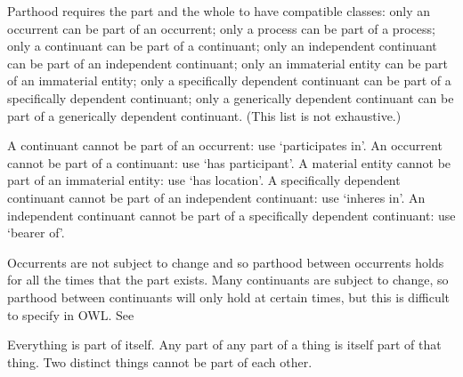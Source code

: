 \documentclass[letterpaper,10pt,english]{sphinxmanual}
\begin{document}
\begin{sphinxShadowBox}

\sphinxAtStartPar
Parthood requires the part and the whole to have compatible classes: only an occurrent can be part of an occurrent; only a process can be part of a process; only a continuant can be part of a continuant; only an independent continuant can be part of an independent continuant; only an immaterial entity can be part of an immaterial entity; only a specifically dependent continuant can be part of a specifically dependent continuant; only a generically dependent continuant can be part of a generically dependent continuant. (This list is not exhaustive.)

\sphinxAtStartPar
A continuant cannot be part of an occurrent: use ‘participates in’. An occurrent cannot be part of a continuant: use ‘has participant’. A material entity cannot be part of an immaterial entity: use ‘has location’. A specifically dependent continuant cannot be part of an independent continuant: use ‘inheres in’. An independent continuant cannot be part of a specifically dependent continuant: use ‘bearer of’.

\sphinxAtStartPar
Occurrents are not subject to change and so parthood between occurrents holds for all the times that the part exists. Many continuants are subject to change, so parthood between continuants will only hold at certain times, but this is difficult to specify in OWL. See 

\sphinxAtStartPar
Everything is part of itself. Any part of any part of a thing is itself part of that thing. Two distinct things cannot be part of each other.
\end{sphinxShadowBox}

\begin{sphinxShadowBox}

\sphinxAtStartPar
{}
\end{sphinxShadowBox}

\begin{sphinxShadowBox}

\sphinxAtStartPar
{}

\sphinxAtStartPar
{}

\sphinxAtStartPar
{}
\end{sphinxShadowBox}
\begin{quote}

\ignorespaces \end{quote}
\end{document}
